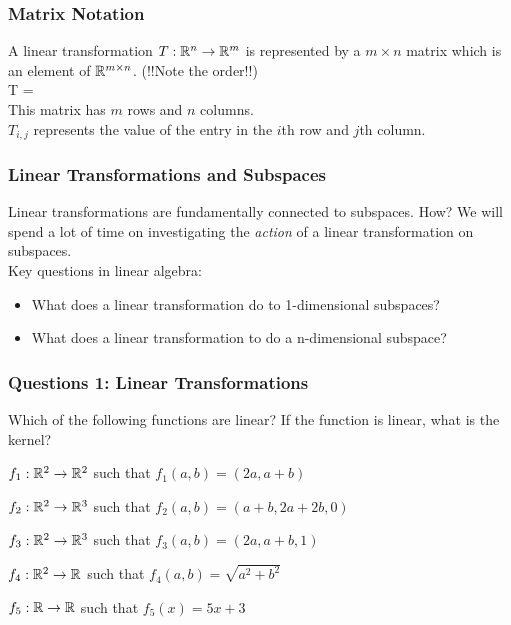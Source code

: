 \documentclass{beamer}
\renewenvironment{enumerate}%
{\begin{list}{\arabic{enumi}.}%
      {\setlength{\leftmargin}{2.5em}%
       \setlength{\itemsep}{-\parsep}%
       \setlength{\topsep}{-\parskip}%
       \usecounter{enumi}}%
 }{\end{list}}
\begin{document}

\begin{frame}
\frametitle{Matrix Notation}
A linear transformation $ T: \mathbb{R}^n \to \mathbb{R}^m$ is represented by a $m \times n $ matrix
which is an element of $\mathbb{R}^{m\times n}$. (!!Note the order!!)\\
T = 
\\
\bigskip
This matrix has $m$ rows and $n$ columns. \\
$T_{i,j}$ represents the value of the entry in the $i$th row and $j$th column.
\end{frame}


\begin{frame}
\frametitle{Linear Transformations and Subspaces}
Linear transformations are fundamentally connected to subspaces. How?
We will spend a lot of time on investigating the \textit{action} of a linear transformation 
on subspaces.\\
\medskip
Key questions in linear algebra: 
\begin{itemize}
\item What does a linear transformation do to 1-dimensional subspaces?
\item What does a linear transformation to do a n-dimensional subspace?
\end{itemize}

\end{frame}


\begin{frame}
\frametitle{Questions 1: Linear Transformations}
Which of the following functions are linear?  If the function is
linear, what is the kernel?
  \begin{enumerate}
  \item $f_1:\mathbb{R}^2\to\mathbb{R}^2$ such that $f_1(a,b) = (2a,a+b)$
  \item $f_2:\mathbb{R}^2\to\mathbb{R}^3$ such that $f_2(a,b) = (a+b,2a+2b,0)$
  \item $f_3:\mathbb{R}^2\to\mathbb{R}^3$ such that $f_3(a,b) = (2a,a+b,1)$
  \item $f_4:\mathbb{R}^2\to\mathbb{R}$ such that $f_4(a,b) = \sqrt{a^2+b^2}$
  \item $f_5:\mathbb{R}\to\mathbb{R}$ such that $f_5(x) = 5x+3$
  \end{enumerate}
\end{frame}
\end{document}
